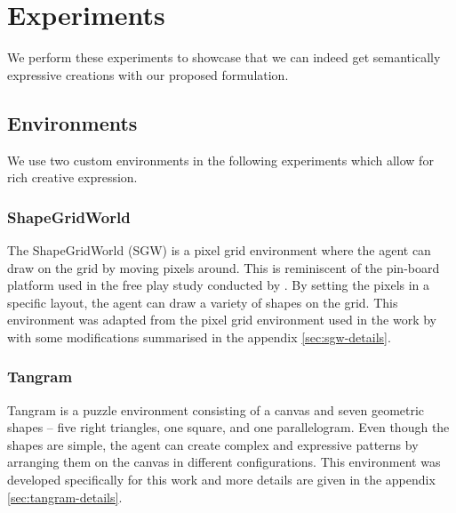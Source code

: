 \chapter{Experiments}
\label{sec:experiments}

We perform these experiments to showcase that we can indeed get semantically expressive creations with our proposed formulation.


\section{Environments}

We use two custom environments in the following experiments which allow for rich creative expression.

\subsection{ShapeGridWorld}
\label{sec:sgw}
The ShapeGridWorld (SGW) is a pixel grid environment where the agent can draw on the grid by moving pixels around.
This is reminiscent of the pin-board platform used in the free play study conducted by \citet{diggs}.
By setting the pixels in a specific layout, the agent can draw a variety of shapes on the grid.
This environment was adapted from the pixel grid environment used in the work by \citet{rair} with some modifications summarised in the appendix \ref{sec:sgw-details}.

\subsection{Tangram}
\label{sec:tangram}
Tangram is a puzzle environment consisting of a canvas and seven geometric shapes -- five right triangles, one square, and one parallelogram.
Even though the shapes are simple, the agent can create complex and expressive patterns by arranging them on the canvas in different configurations.
This environment was developed specifically for this work and more details are given in the appendix \ref{sec:tangram-details}.

